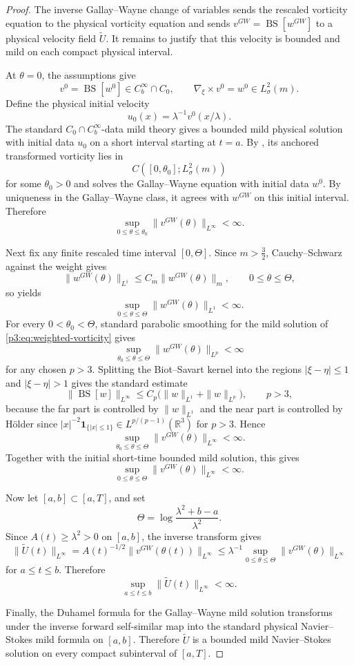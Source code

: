 \documentclass[11pt]{amsart}
\theoremstyle{plain}
\theoremstyle{definition}
\theoremstyle{remark}
\numberwithin{equation}{section}
\begin{document}
\begin{proof}
The inverse Gallay--Wayne change of variables sends the rescaled vorticity
equation to the physical vorticity equation and sends
\(v^{GW}=\operatorname{BS}[w^{GW}]\) to a physical velocity field
\(\widetilde U\).  It remains to justify that this velocity is bounded and
mild on each compact physical interval.

At \(\theta=0\), the assumptions give
\[
   v^0=\operatorname{BS}[w^0]\in C_b^\infty\cap C_0,
   \qquad
   \nabla_\xi\times v^0=w^0\in L^2_\sigma(m).
\]
Define the physical initial velocity
\[
   u_0(x)=\lambda^{-1}v^0(x/\lambda).
\]
The standard \(C_0\cap C_b^\infty\)-data mild theory gives a bounded mild physical
solution with initial data \(u_0\) on a short interval starting at \(t=a\).  By
, its anchored transformed
vorticity lies in
\[
   C([0,\theta_0];L^2_\sigma(m))
\]
for some \(\theta_0>0\) and solves the Gallay--Wayne equation with initial data
\(w^0\).  By uniqueness in the Gallay--Wayne class, it agrees with
\(w^{GW}\) on this initial interval.
Therefore
\[
   \sup_{0\le\theta\le\theta_0}\|v^{GW}(\theta)\|_{L^\infty}<\infty .
\]

Next fix any finite rescaled time interval \([0,\Theta]\).  Since
\(m>\frac32\), Cauchy--Schwarz against the weight gives
\[
   \|w^{GW}(\theta)\|_{L^1}
   \le
   C_m\|w^{GW}(\theta)\|_m,
   \qquad 0\le\theta\le\Theta,
\]
so  yields
\[
   \sup_{0\le\theta\le\Theta}\|w^{GW}(\theta)\|_{L^1}<\infty .
\]
For every \(0<\theta_0<\Theta\), standard parabolic smoothing for the mild
solution of \eqref{p3:eq:weighted-vorticity} gives
\[
   \sup_{\theta_0\le\theta\le\Theta}\|w^{GW}(\theta)\|_{L^p}<\infty
\]
for any chosen \(p>3\).  Splitting the Biot--Savart kernel into the regions
\(|\xi-\eta|\le1\) and \(|\xi-\eta|>1\) gives the standard estimate
\[
   \|\operatorname{BS}[w]\|_{L^\infty}
   \le
   C_p\bigl(\|w\|_{L^1}+\|w\|_{L^p}\bigr),
   \qquad p>3,
\]
because the far part is controlled by \(\|w\|_{L^1}\) and the near part is
controlled by H\"older since
\(|x|^{-2}\mathbf 1_{\{|x|\le1\}}\in L^{p/(p-1)}(\mathbb R^3)\) for \(p>3\).
Hence
\[
   \sup_{\theta_0\le\theta\le\Theta}\|v^{GW}(\theta)\|_{L^\infty}<\infty .
\]
Together with the initial short-time bounded mild solution, this gives
\[
   \sup_{0\le\theta\le\Theta}\|v^{GW}(\theta)\|_{L^\infty}<\infty .
\]

Now let \([a,b]\subset[a,T]\), and set
\[
   \Theta=\log\frac{\lambda^2+b-a}{\lambda^2}.
\]
Since \(A(t)\ge\lambda^2>0\) on \([a,b]\), the inverse transform gives
\[
   \|\widetilde U(t)\|_{L^\infty}
   =
   A(t)^{-1/2}\|v^{GW}(\theta(t))\|_{L^\infty}
   \le
   \lambda^{-1}\sup_{0\le\theta\le\Theta}\|v^{GW}(\theta)\|_{L^\infty}
\]
for \(a\le t\le b\).  Therefore
\[
   \sup_{a\le t\le b}\|\widetilde U(t)\|_{L^\infty}<\infty .
\]

Finally, the Duhamel formula for the Gallay--Wayne mild solution transforms
under the inverse forward self-similar map into the standard physical
Navier--Stokes mild formula on \([a,b]\).  Therefore \(\widetilde U\) is a
bounded mild Navier--Stokes solution on every compact subinterval of
\([a,T]\).
\end{proof}
\end{document}

